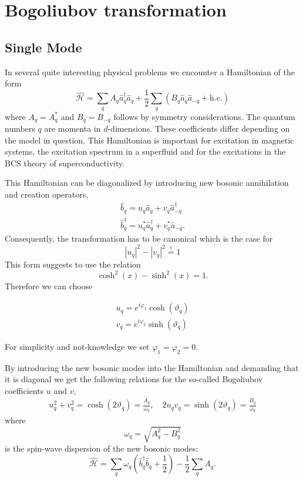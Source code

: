\documentclass[11pt]{book}
\newcommand{\ad}{\hat{a}^\dagger}
\renewcommand{\a}{\hat{a}}
\renewcommand{\b}{\hat{b}}
\newcommand{\bd}{\hat{b}^\dagger}
\renewcommand{\H}{\hat{\mathcal{H}}}
\newcommand{\hc}{\text{h.c.}}
\begin{document}
\clearpage
\newpage

\chapter{Bogoliubov transformation}

\section{Single Mode}

In several quite interesting physical problems we encounter a Hamiltonian of the form
\begin{equation}
  \H = \sum_q A_q \ad_q \a_q + \frac{1}{2} \sum_q \left(B_q \a_q \a_{-q} + \hc\right)
\end{equation}
where  $ A_q = A^*_q $ and $ B_q = B_{-q} $ follows by symmetry considerations. The quantum numbers $ q $ are momenta in $ d $-dimensions.   These coefficients differ depending on the model in question. This Hamiltonian is important for excitation in magnetic systems, the excitation spectrum in a superfluid and for the excitations in the BCS theory of superconductivity.

This Hamiltonian can be diagonalized by introducing new bosonic annihilation and creation operators,
\begin{eqnarray}
  \b_{q} = u_{q} \a_q + v_q \ad_{-q}\\
  \bd_{q} = u^*_{q} \ad_q + v^*_q \a_{-q}.
\end{eqnarray}
Consequently, the transformation has to be canonical which is the case for 
\begin{equation}
  \left| u_q \right|^2 - \left| v_q \right|^2 \overset{!}{=} 1
\end{equation}
This form suggests to use the relation \[ \cosh^2(x) - \sinh^2(x) = 1. \] Therefore we can choose

\begin{eqnarray}
  u_q = e^{i\varphi_1} \cosh(\vartheta_q)\\
  v_q = e^{i\varphi_2} \sinh(\vartheta_q)
\end{eqnarray}

For simplicity and not-knowledge we set $ \varphi_1 = \varphi_2 = 0 $. 

By introducing the new bosonic modes into the Hamiltonian and demanding that it is diagonal we get the following relations for the so-called Bogoliubov coefficients $ u $ and $ v $,
\begin{eqnarray}
  u_q^2 + v_q^2 = \cosh(2\vartheta_q) = \frac{A_q}{\omega_q}, \quad 2u_q v_q = \sinh(2\vartheta_q) = \frac{B_q}{\omega_q}
\end{eqnarray}
where 
\begin{equation}
   \omega_q = \sqrt{A_q^2 - B_q^2}
\end{equation}
is the spin-wave dispersion of the new bosonic modes:
\begin{equation}
  \H = \sum_q \omega_q \left(\bd_q\b_q + \frac{1}{2}\right) - \frac{1}{2} \sum_{q} A_q.
\end{equation}
\end{document}
